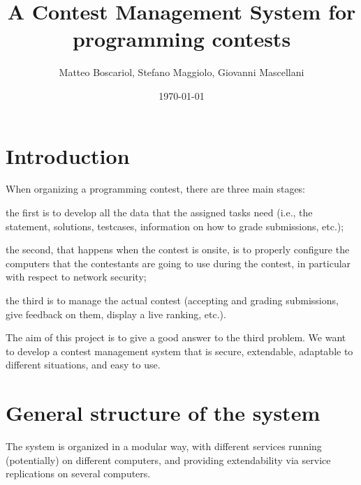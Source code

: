 \documentclass[a4paper,8pt]{amsart}
\title{A Contest Management System for programming contests}
\author{Matteo Boscariol, Stefano Maggiolo, Giovanni Mascellani}
\date{\today}
\newenvironment{squishlist}{%
  \begin{list}{\textbullet}%
    { \setlength{\itemsep}{0pt}%
      \setlength{\parsep}{3pt}%
      \setlength{\topsep}{3pt}%
      \setlength{\partopsep}{0pt}%
      \setlength{\leftmargin}{1.5em}%
      \setlength{\labelwidth}{1em}%
      \setlength{\labelsep}{0.5em} }%
}{\end{list}}
\begin{document}
\maketitle
\tableofcontents

\begin{multicols}{2}

  \section{Introduction}

  When organizing a programming contest, there are three main stages:
  \begin{squishlist}
  \item the first is to develop all the data that the assigned tasks
    need (i.e., the statement, solutions, testcases, information on
    how to grade submissions, etc.);
  \item the second, that happens when the contest is onsite, is to
    properly configure the computers that the contestants are going to
    use during the contest, in particular with respect to network
    security;
  \item the third is to manage the actual contest (accepting and
    grading submissions, give feedback on them, display a live
    ranking, etc.).
  \end{squishlist}

  The aim of this project is to give a good answer to the third
  problem. We want to develop a contest management system that is
  secure, extendable, adaptable to different situations, and easy to
  use.

  \section{General structure of the system}

  The system is organized in a modular way, with different services
  running (potentially) on different computers, and providing
  extendability via service replications on several computers.


\end{multicols}
\end{document}
